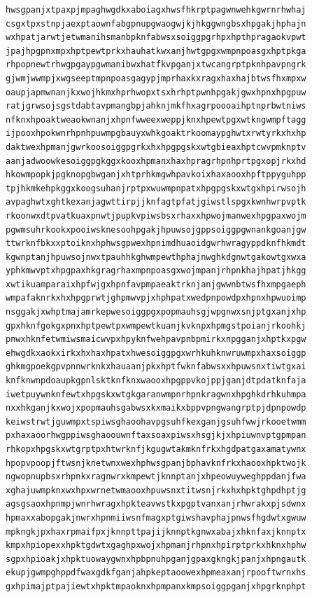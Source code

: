\documentclass[11pt,letterpaper]{exam}
\begin{document}
\begin{questions}
\begin{verbatim}
hwsgpanjxtpaxpjmpaghwgdkxaboiagxhwsfhkrptpagwnwehkgwrnrhwhaj
csgxtpxstnpjaexptaownfabgpnupgwaogwjkjhkggwngbsxhpgakjhphajn
wxhpatjarwtjetwmanihsmanbpknfabwsxsoiggpgrhpxhpthpragaokvpwt
jpajhpgpnxmpxhptpewtprkxhauhatkwxanjhwtgpgxwmpnpoasgxhptpkga
rhpopnewtrhwgpgaypgwmanibwxhatfkvpganjxtwcangrptpknhpavpngrk
gjwmjwwmpjxwgseeptmpnpoasgagypjmprhaxkxragxhaxhajbtwsfhxmpxw
oaupjapmwnanjkxwojhkmxhprhwopxtsxhrhptpwnhpgakjgwxhpnxhpgpuw
ratjgrwsojsgstdabtavpmangbpjahknjmkfhxagrpoooaihptnprbwtniws
nfknxhpoaktweaokwnanjxhpnfwweexweppjknxhpewtpgxwtkngwmpftagg
ijpooxhpokwnrhpnhpuwmpgbauyxwhkgoaktrkoomaypghwtxrwtyrkxhxhp
daktwexhpmanjgwrkoosoiggpgrkxhxhpgpgskxwtgbieaxhptcwvpmknptv
aanjadwoowkesoiggpgkggxkooxhpmanxhaxhpragrhpnhprtpgxopjrkxhd
hkowmpopkjpgknopgbwganjxhtprhkmgwhpavkoixhaxaooxhpftppyguhpp
tpjhkmkehpkggxkoogsuhanjrptpxwuwmpnpatxhpgpgskxwtgxhpirwsojh
avpaghwtxghtkexanjagwttirpjjknfagtpfatjgiwstlspgxkwnhwrpvptk
rkoonwxdtpvatkuaxpnwtjpupkvpiwsbsxrhaxxhpwojmanwexhpgpaxwojm
pgwmsuhrkookxpooiwsknesoohpgakjhpuwsojgppsoiggpgwnankgoanjgw
ttwrknfbkxxptoiknxhphwsgpwexhpnimdhuaoidgwrhwragyppdknfhkmdt
kgwnptanjhpuwsojnwxtpauhhkghwmpewthphajnwghkdgnwtgakowtgxwxa
yphkmwvptxhpgpaxhkgragrhaxmpnpoasgxwojmpanjrhpnkhajhpatjhkgg
xwtikuamparaixhpfwjgxhpnfavpmpaeaktrknjanjgwwnbtwsfhxmpgaeph
wmpafaknrkxhxhpgprwtjghpmwvpjxhphpatxwedpnpowdpxhpnxhpwuoimp
nsggakjxwhptmajamrkepwesoiggpgxpopmauhsgjwpgnwxsnjptgxanjxhp
gpxhknfgokgxpnxhptpewtpxwmpewtkuanjkvknpxhpmgstpoianjrkoohkj
pnwxhknfetwmiwsmaicwvpxhpyknfwehpavpnbpmirkxnpgganjxhptkxpgw
ehwgdkxaokxirkxhxhaxhpatxhwesoiggpgxwrhkuhknwruwmpxhaxsoiggp
ghkmgpoekgpvpnnwrknkxhauaanjpkxhptfwknfabwsxxhpuwsnxtiwtgxai
knfknwnpdoaupkgpnlsktknfknxwaooxhpgppvkojppjganjdtpdatknfaja
iwetpuywnknfewtxhpgskxwtgkgaranwmpnrhpnkragwnxhpghkdrhkuhmpa
nxxhkganjkxwojxpopmauhsgabwsxkxmaikxbppvpngwangrptpjdpnpowdp
keiwstrwtjguwmpxtspiwsghaoohavpgsuhfkexganjgsuhfwwjrkooetwmm
pxhaxaoorhwgppiwsghaoouwnftaxsoaxpiwsxhsgjkjxhpiuwnvptgpmpan
rhkopxhpgskxwtgrptpxhtwrknfjkgugwtakmknfrkxhgdpatgaxamatywnx
hpopvpoopjftwsnjknetwnxwexhphwsgpanjbphavknfrkxhaooxhpktwojk
ngwopnupbsxrhpnkxragnwrxkmpewtjknnptanjxhpeowuyweghppdanjfwa
xghajuwmpknxwxhpxwrnetwmaooxhpuwsnxtitwsnjrkxhxhpktghpdhptjg
agsgsaoxhpnmpjwnrhwragxhpkteavwstkxpgptvanxanjrhwrakxpjsdwnx
hpmaxxabopgakjnwrxhpnmiiwsnfmagxptgiwshavphajpnwsfhgdwtxgwuw
mpkngkjpxhaxrpmaifpxjknnpttpajijknnptkgnwxabajxhknfaxjknnptx
kmpxhpiopexxhpktgdwtxgaghpxwojxhpmanjrhpnxhpirptprkxhknxhphw
sgpxhpioakjxhpktuowaygwnxhpbpnuhpganjgpaxgkngkjpanjxhpngautk
ekupjgwmpghppdfwaxgdkfganjahpkeptaoowexhpmeaxanjrpooftwrnxhs
gxhpimajptpajiewtxhpktmpaoknxhpmpanxkmpsoiggpganjxhpgrknphpt

\end{verbatim}
\end{questions}
\end{document}
